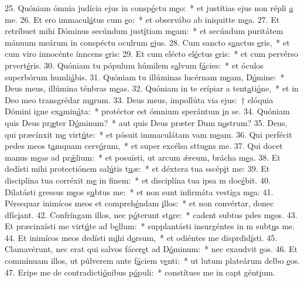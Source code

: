 25. Quóniam ómnia judícia ejus in consp\uline{é}ctu m\uline{e}o:~* et justítias ejus non répli \uline{a} me.
26. Et ero immacul\uline{á}tus cum \uline{e}o:~* et observábo ab iniquitte m\uline{e}a.
27. Et retríbuet mihi Dóminus secúndum just\uline{í}tiam m\uline{e}am:~* et secúndum puritátem mánuum meárum in conspéctu oculrum \uline{e}jus.
28. Cum sancto s\uline{a}nctus \uline{e}ris,~* et cum viro innocénte ínncens \uline{e}ris:
29. Et cum elécto el\uline{é}ctus \uline{e}ris:~* et cum pervérso prvert\uline{é}ris.
30. Quóniam tu pópulum húmilem s\uline{a}lvum f\uline{á}cies:~* et óculos superbórum humli\uline{á}bis.
31. Quóniam tu illúminas lucérnam m\uline{e}am, D\uline{ó}mine:~* Deus meus, illúmina ténbras m\uline{e}as.
32. Quóniam in te erípiar a tent\uline{a}ti\uline{ó}ne,~* et in Deo meo transgrédar m\uline{u}rum.
33. Deus meus, impollúta via ejus:~† elóquia Dómini igne ex\uline{a}min\uline{á}ta:~* protéctor est ómnium sperántum \uline{i}n se.
34. Quóniam quis Deus pr\uline{æ}ter D\uline{ó}minum?~* aut quis Deus præter Dum n\uline{o}strum?
35. Deus, qui præcínxit m\uline{e} virt\uline{ú}te:~* et pósuit immaculátam vam m\uline{e}am.
36. Qui perfécit pedes meos t\uline{a}mquam cerv\uline{ó}rum,~* et super excélsa sttu\uline{e}ns me.
37. Qui docet manus m\uline{e}as ad pr\uline{ǽ}lium:~* et posuísti, ut arcum ǽreum, brácha m\uline{e}a.
38. Et dedísti mihi protectiónem sal\uline{ú}tis t\uline{u}æ:~* et déxtera tua sscép\uline{i}t me:
39. Et disciplína tua corréxit m\uline{e} in f\uline{i}nem:~* et disciplína tua ipsa m doc\uline{é}bit.
40. Dilatásti gressus m\uline{e}os s\uline{u}btus me:~* et non sunt infirmáta vestíga m\uline{e}a:
41. Pérsequar inimícos meos et compreh\uline{é}ndam \uline{i}llos:~* et non convértar, donec dfíc\uline{i}ant.
42. Confríngam illos, nec p\uline{ó}terunt st\uline{a}re:~* cadent subtus pdes m\uline{e}os.
43. Et præcinxísti me virt\uline{ú}te ad b\uline{e}llum:~* supplantásti insurgéntes in m subt\uline{u}s me.
44. Et inimícos meos dedísti m\uline{i}hi d\uline{o}rsum,~* et odiéntes me disprdid\uline{í}sti.
45. Clamavérunt, nec erat qui salvos fácer\uline{e}t ad D\uline{ó}minum:~* nec exaudvit \uline{e}os.
46. Et commínuam illos, ut púlverem ante f\uline{á}ciem v\uline{e}nti:~* ut lutum plateárum delbo \uline{e}os.
47. Eripe me de contradicti\uline{ó}nibus p\uline{ó}puli:~* constítues me in capt gént\uline{i}um.
